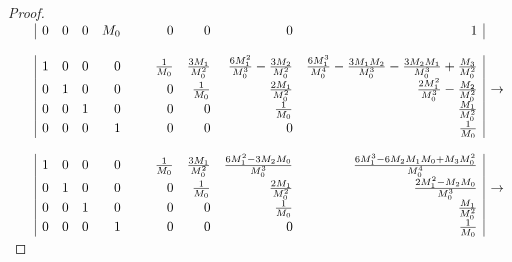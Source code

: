 \begin{proof}
\begin{math}
\begin{array}{rr|rrrr@{\hspace{3ex}\hspace{3ex}}rrrr|c}
    &&   0 &     0 &     0 &  M_0  & 0 & 0                &  0                                    & 1                                                                                  &
    \\ \\
    &&   1 &     0 &     0 &    0  & \frac{1}{M_0} & \frac{3M_1}{M_0^2} & \frac{6M_1^2}{M_0^3}-\frac{3M_2}{M_0^2} & \frac{6M_1^3}{M_0^4}-\frac{3M_1M_2}{M_0^3} - \frac{3M_2M_1}{M_0^3}+\frac{M_3}{M_0^2} &             \\
    &&   0 &     1 &     0 &    0  & 0 & \frac{1}{M_0}    &  \frac{2M_1}{M_0^2}                     & \frac{2M_1^2}{M_0^3}-\frac{M_2}{M_0^2}                                                             & \rightarrow \\
    &&   0 &     0 &     1 &    0  & 0 & 0                &  \frac{1}{M_0}                          & \frac{M_1}{M_0^2}                                                                                  &             \\
    &&   0 &     0 &     0 &    1  & 0 & 0                &  0                                    & \frac{1}{M_0}                                                                                        &
    \\ \\
    &&   1 &     0 &     0 &    0  & \frac{1}{M_0} & \frac{3M_1}{M_0^2} & \frac{6M_1^2-3M_2M_0}{M_0^3} & \frac{6M_1^3-6M_2M_1M_0+M_3M_0^2}{M_0^4}  &             \\
    &&   0 &     1 &     0 &    0  & 0 & \frac{1}{M_0}    &  \frac{2M_1}{M_0^2}                     & \frac{2M_1^2-M_2M_0}{M_0^3}                  & \rightarrow \\
    &&   0 &     0 &     1 &    0  & 0 & 0                &  \frac{1}{M_0}                          & \frac{M_1}{M_0^2}                            &             \\
    &&   0 &     0 &     0 &    1  & 0 & 0                &  0                                    & \frac{1}{M_0}                                  &
  \end{array}
\end{math}


\end{proof}
